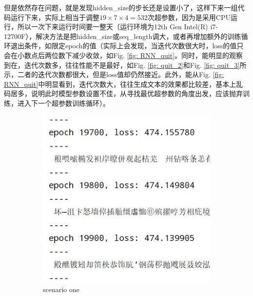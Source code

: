 \documentclass[letterpaper,12pt]{article}
\begin{document}
			但是依然存在问题，就是发现hidden\_size的步长还是设置小了，这样下来一组代码运行下来，实际上相当于调整$19 \times 7 \times 4 = 532$次超参数，因为是采用CPU运行，所以一次下来运行时间要一整天（运行环境为12th Gen Intel(R) i7-12700F），解决方法是把hidden\_size或seq\_length调大，或者再增加额外的训练循环退出条件，如限定epoch的值（实际上会发现，当迭代次数很大时，loss的值只会在小数点后两位数下减少收敛，如Fig. \ref{fig: RNN_quit}。同时，能明显的观察到在，迭代次数多，往往性能不是最好，如Fig. \ref{fig: quit_2}和Fig. \ref{fig: quit_3}所示，二者的迭代次数都很大，但是loss值却仍然接近。此外，能从Fig. \ref{fig: RNN_quit}中明显看到，迭代次数大，往往生成文本的效果都比较差，基本上乱码居多，说明此时模型参数设置不佳，从寻找最优超参数的角度出发，应该抛弃训练，进入下一个超参数训练循环）。
			
			\begin{figure}[htbp] 
				\centering 
				\begin{subfigure}{0.23\textwidth}
					\includegraphics[width=\linewidth]{RNN/quit_1}
					\captionsetup{font=scriptsize}
					\caption{scenario one }
					\label{fig: quit_1}
				\end{subfigure}
				\begin{subfigure}{0.23\textwidth}

\end{subfigure}
\end{figure}
\end{document}
